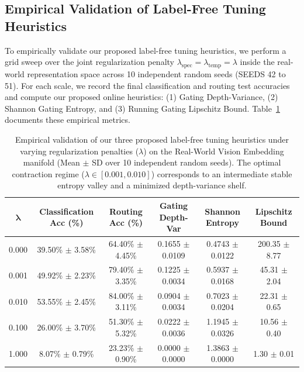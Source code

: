\subsection{Empirical Validation of Label-Free Tuning Heuristics}
To empirically validate our proposed label-free tuning heuristics, we perform a grid sweep over the joint regularization penalty $\lambda_{\text{spec}} = \lambda_{\text{temp}} = \lambda$ inside the real-world representation space across 10 independent random seeds (SEEDS 42 to 51). For each scale, we record the final classification and routing test accuracies and compute our proposed online heuristics: (1) Gating Depth-Variance, (2) Shannon Gating Entropy, and (3) Running Gating Lipschitz Bound. Table~\ref{tab:heuristics_results} documents these empirical metrics.

\begin{table}[t]
\centering
\small
\caption{Empirical validation of our three proposed label-free tuning heuristics under varying regularization penalties ($\lambda$) on the Real-World Vision Embedding manifold (Mean $\pm$ SD over 10 independent random seeds). The optimal contraction regime ($\lambda \in [0.001, 0.010]$) corresponds to an intermediate stable entropy valley and a minimized depth-variance shelf.}
\vskip 0.15in
\label{tab:heuristics_results}
\begin{tabular}{cccccc}
\toprule
$\boldsymbol{\lambda}$ & \textbf{Classification Acc (\%)} & \textbf{Routing Acc (\%)} & \textbf{Gating Depth-Var} & \textbf{Shannon Entropy} & \textbf{Lipschitz Bound} \\
\midrule
0.000 & 39.50\% $\pm$ 3.58\% & 64.40\% $\pm$ 4.45\% & 0.1655 $\pm$ 0.0109 & 0.4743 $\pm$ 0.0122 & 200.35 $\pm$ 8.77 \\
0.001 & 49.92\% $\pm$ 2.23\% & 79.40\% $\pm$ 3.35\% & 0.1225 $\pm$ 0.0034 & 0.5937 $\pm$ 0.0168 & 45.31 $\pm$ 2.04 \\
0.010 & 53.55\% $\pm$ 2.45\% & 84.00\% $\pm$ 3.11\% & 0.0904 $\pm$ 0.0034 & 0.7023 $\pm$ 0.0204 & 22.31 $\pm$ 0.65 \\
0.100 & 26.00\% $\pm$ 3.70\% & 51.30\% $\pm$ 5.32\% & 0.0222 $\pm$ 0.0036 & 1.1945 $\pm$ 0.0326 & 10.56 $\pm$ 0.40 \\
1.000 & 8.07\% $\pm$ 0.79\% & 23.23\% $\pm$ 0.90\% & 0.0000 $\pm$ 0.0000 & 1.3863 $\pm$ 0.0000 & 1.30 $\pm$ 0.01 \\
\bottomrule
\end{tabular}
\end{table}

